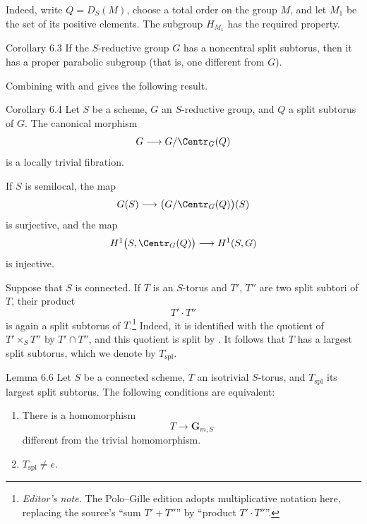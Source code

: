 Indeed, write \(Q=D_S(M)\), choose a total order on the group \(M\),
and let \(M_1\) be the set of its positive elements.  The subgroup
\(H_{M_1}\) has the required property.

\begin{sgastatement}{Corollary 6.3}
If the \(S\)-reductive group \(G\) has a noncentral split subtorus,
then it has a proper parabolic subgroup \textup{(that is, one
different from \(G\))}.
\end{sgastatement}

Combining  with  and  gives the following result.

\begin{sgastatement}{Corollary 6.4}
Let \(S\) be a scheme, \(G\) an \(S\)-reductive group, and \(Q\) a
split subtorus of \(G\).  The canonical morphism
\[
 G\longrightarrow G/\Centr_G(Q)
\]
is a locally trivial fibration.

If \(S\) is semilocal, the map
\[
 G(S)\longrightarrow\bigl(G/\Centr_G(Q)\bigr)(S)
\]
is surjective, and the map
\[
 H^1\bigl(S,\Centr_G(Q)\bigr)\longrightarrow H^1(S,G)
\]
is injective.
\end{sgastatement}


Suppose that \(S\) is connected.  If \(T\) is an \(S\)-torus and
\(T'\), \(T''\) are two split subtori of \(T\), their product
\[
 T'\cdot T''
\]
is again a split subtorus of \(T\).\footnote{\emph{Editor's note.}
The Polo--Gille edition adopts multiplicative notation here,
replacing the source's ``sum \(T'+T''\)'' by ``product
\(T'\cdot T''\)''.}  Indeed, it is identified with the quotient of
\(T'\times_S T''\) by \(T'\cap T''\), and this quotient is split by
.  It follows that \(T\) has a largest split subtorus,
which we denote by \(T_{\mathrm{spl}}\).

\begin{sgastatement}{Lemma 6.6}
Let \(S\) be a connected scheme, \(T\) an isotrivial \(S\)-torus,
and \(T_{\mathrm{spl}}\) its largest split subtorus.  The following
conditions are equivalent:
\begin{enumerate}[label=\textup{(\roman*)}]
\item There is a homomorphism
\[
 T\longrightarrow\mathbf G_{m,S}
\]
different from the trivial homomorphism.
\item \(T_{\mathrm{spl}}\ne e\).
\end{enumerate}
\end{sgastatement}

